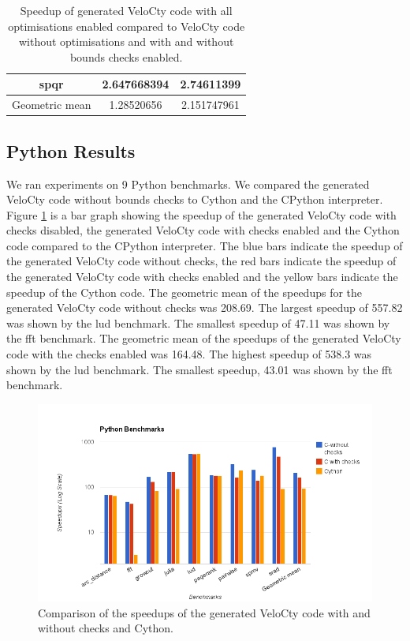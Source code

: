 \begin{table}[htbp]
\begin{tabular}{|c|c|c|}
spqr                        & 2.647668394                                                                    & 2.74611399                                                                  \\ \hline
Geometric mean              & 1.28520656                                                                     & 2.151747961                                                                 \\ \hline
\end{tabular}
\caption{Speedup of generated VeloCty code with all optimisations enabled compared to VeloCty code without optimisations and with and without bounds checks enabled.}
\label{tab:covscwcwo}
\end{table}
\subsection{Python Results}
We ran experiments on 9 Python benchmarks. We compared the generated VeloCty code without bounds checks to Cython and the CPython interpreter. Figure \ref{fig:results_cwochecks_py} is a bar graph showing the speedup of the generated VeloCty code with checks disabled, the generated VeloCty code with checks enabled and the Cython code compared to the CPython interpreter. The blue bars indicate the speedup of the generated VeloCty code without checks, the red bars indicate the speedup of the generated VeloCty code with checks enabled and the yellow bars indicate the speedup of the Cython code. The geometric mean of the speedups for the generated VeloCty code without checks was 208.69. The largest speedup of 557.82  was shown by the lud benchmark. The smallest speedup of 47.11 was shown by the fft benchmark. The geometric mean of the speedups of the generated VeloCty code with the checks enabled was 164.48. The highest speedup of 538.3 was shown by the lud benchmark. The smallest speedup, 43.01 was shown by the fft benchmark. 
\begin{figure}[htbp]
\centering
\includegraphics[scale=0.5]{Figures/results_cwochecks_py.png}
\caption{Comparison of the speedups of the generated VeloCty code with and without checks and Cython.}
\label{fig:results_cwochecks_py}
\end{figure}


